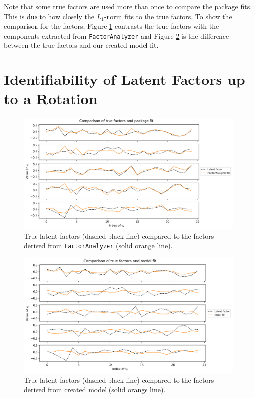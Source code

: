 \documentclass[12pt, letterpaper]{article}
\begin{document}
Note that some true factors are used more than once to compare the package fits. This is due to how closely the $L_1$-norm fits to the true factors. To show the comparison for the factors, Figure \ref{fig:true_v_package} contrasts the true factors with the components extracted from \texttt{FactorAnalyzer} and Figure \ref{fig:true_v_model} is the difference between the true factors and our created model fit.


\section{Identifiability of Latent Factors up to a Rotation}


\begin{figure}
    \centering
    \includegraphics[width=16cm]{true_v_package.png}
    \caption{True latent factors (dashed black line) compared to the factors derived from \texttt{FactorAnalyzer} (solid orange line). }
    \label{fig:true_v_package}
\end{figure}


\begin{figure}
    \centering
    \includegraphics[width=16cm]{true_v_model.png}
    \caption{True latent factors (dashed black line) compared to the factors derived from created model (solid orange line).}
    \label{fig:true_v_model}
\end{figure}
\end{document}
